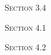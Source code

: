 \documentclass[12pt]{article}
\begin{document}
\begin{center}
\textsc{\Large Section 3.4}
\end{center}




\begin{center}
\textsc{\Large Section 4.1}
\end{center}



\begin{center}
\textsc{\Large Section 4.2}
\end{center}

\end{document}
